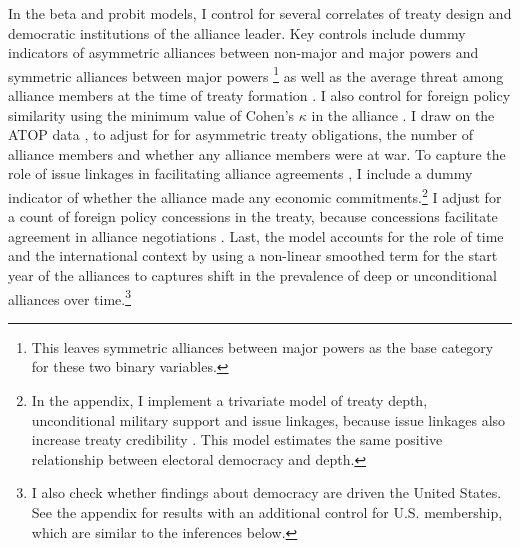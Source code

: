 \documentclass[12pt]{article}
\begin{document}
In the beta and probit models, I control for several correlates of treaty design and democratic institutions of the alliance leader. 
Key controls include dummy indicators of asymmetric alliances between non-major and major powers and symmetric alliances between major powers \citep{Mattes2012}\footnote{This leaves symmetric alliances between major powers as the base category for these two binary variables.} as well as the average threat among alliance members at the time of treaty formation \citep{LeedsSavun2007}. 
I also control for foreign policy similarity using the minimum value of Cohen's $\kappa$ in the alliance \citep{Hage2011}.
I draw on the ATOP data \citep{Leedsetal2002}, to adjust for for asymmetric treaty obligations, the number of alliance members and whether any alliance members were at war. 
To capture the role of issue linkages in facilitating alliance agreements \citep{Poast2012}, I include a dummy indicator of whether the alliance made any economic commitments.\footnote{In the appendix, I implement a trivariate model of treaty depth, unconditional military support and issue linkages, because issue linkages also increase treaty credibility \citep{ Poast2013}. This model estimates the same positive relationship between electoral democracy and depth.}  
I adjust for a count of foreign policy concessions in the treaty, because concessions facilitate agreement in alliance negotiations \citep{Johnson2015}. 
Last, the model accounts for the role of time and the international context by using a non-linear smoothed term for the start year of the alliances to captures shift in the prevalence of deep or unconditional alliances over time.\footnote{I also check whether findings about democracy are driven the United States. See the appendix for results with an additional control for U.S. membership, which are similar to the inferences below.}
\end{document}
